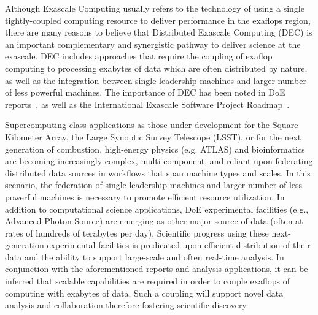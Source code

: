 \documentclass[11pt,final]{article}
\newcommand{\msnote}[1]{ {\textcolor{green} { ***Mark: #1 }}}
\newcommand{\mtnote}[1]{ {\textcolor{cyan} { ***Matteo: #1 }}}
\newcommand{\msnote}[1]{}
\newcommand{\mtnote}[1]{}
\begin{document}
{
Although Exascale Computing usually refers to the technology of using
a single tightly-coupled computing resource to deliver performance in
the exaflops region, there are many reasons to believe that
Distributed Exascale Computing (DEC) is an important complementary and
synergistic pathway to deliver science at the exascale.  DEC includes
approaches that require the coupling of exaflop computing to
processing exabytes of data which are often distributed by nature, as
well as the integration between single leadership machines and larger
number of less powerful machines. The importance of DEC has been noted
in DoE reports~\cite{dmav-exa}, as well as the International Exascale
Software Project Roadmap~\cite{iespr}.


Supercomputing class applications as those under development for the
Square Kilometer Array, the Large Synoptic Survey Telescope (LSST), or
for the next generation of combustion, high-energy physics
(e.g. ATLAS) and bioinformatics are becoming increasingly complex,
multi-component, and reliant upon federating distributed data sources
in workflows that span machine types and scales.  In this scenario,
the federation of single leadership machines and larger number of less
powerful machines is necessary to promote efficient resource
utilization.  In addition to computational science applications, DoE
experimental facilities (e.g., Advanced Photon Source) are emerging as
other major source of data (often at rates of hundreds of terabytes
per day).  Scientific progress using these next-generation
experimental facilities is predicated upon efficient distribution of
their data and the ability to support large-scale and often real-time
analysis.  In conjunction with the aforementioned reports and analysis
applications, it can be inferred that scalable capabilities are
required in order to couple exaflops of computing with exabytes of
data. Such a coupling will support novel data analysis and
collaboration therefore fostering scientific discovery.



}
\end{document}
